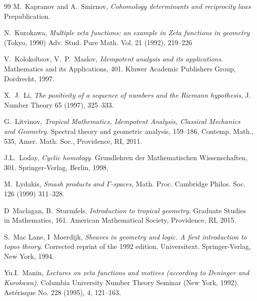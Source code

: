\documentclass[12pt]{article}
\begin{document}
\begin{thebibliography}{99}
 M.~Kapranov and A.~Smirnov, {\em Cohomology
determinants and reciprocity laws} Prepublication.





  N.~Kurokawa, {\em Multiple zeta functions: an example
 in Zeta functions in geometry} (Tokyo, 1990)  Adv. Stud. Pure Math. Vol.  21  (1992), 219--226


  V.~Kolokoltsov, V.~P.~Maslov, {\em Idempotent analysis and its applications}.  Mathematics and its Applications, 401. Kluwer Academic Publishers Group, Dordrecht, 1997.

 X.~J.~Li,     {\em The positivity of a sequence of numbers and the Riemann hypothesis},          J. Number Theory 65 (1997), 325--333.

 G.~Litvinov, {\em Tropical Mathematics, Idempotent Analysis, Classical Mechanics and Geometry}. Spectral theory and geometric analysis, 159--186, Contemp. Math., 535, Amer. Math. Soc., Providence, RI, 2011.

 J.L.~Loday, {\em Cyclic homology}. Grundlehren der
Mathematischen Wissenschaften, 301. Springer-Verlag, Berlin, 1998.

 M.~Lydakis, {\em  Smash products and $\Gamma$-spaces}, Math. Proc. Cambridge Philos. Soc. 126 (1999) 311--328.


 D~Maclagan, B.~Sturmfels,   {\em  Introduction to tropical geometry}. Graduate Studies in Mathematics, 161. American Mathematical Society, Providence, RI, 2015.

 S.~Mac Lane, I~Moerdijk, {\em Sheaves in geometry and logic. A first introduction to topos theory}. Corrected reprint of the 1992 edition. Universitext. Springer-Verlag, New York, 1994.



 Yu.I.~Manin, {\em Lectures on zeta functions
and motives (according to Deninger and Kurokawa)}. Columbia
University Number Theory Seminar (New York, 1992). Ast\'erisque  No.
228  (1995), 4, 121--163.







\end{thebibliography}
\end{document}
